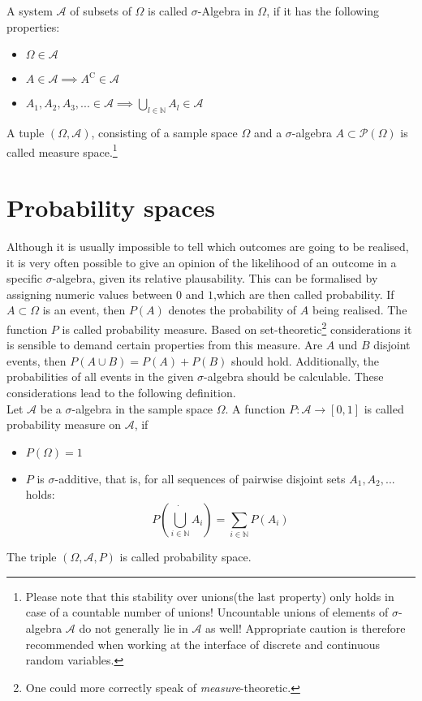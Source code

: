 \documentclass[12pt]{article}
\begin{document}
A system $\mathscr{A}$ of subsets of $\Omega$ is called $\sigma$-Algebra in $\Omega$, if it has the following properties:
\begin{itemize}
\item{$\Omega \in \mathscr{A}$}
\item{$A \in \mathscr{A} \implies A^{\mathrm{C}} \in \mathscr{A}$}
\item{$A_1, A_2, A_3, ... \in \mathscr{A} \implies \bigcup\limits_{l \in \mathbb{N}} A_l \in \mathscr{A}$}
\end{itemize}
A tuple $(\Omega, \mathscr{A})$, consisting of a sample space $\Omega$
 and a $\sigma$-algebra $A \subset \mathcal{P}(\Omega)$ is called measure space.\footnote{Please note that this \glqq stability over unions\grqq (the last property) only holds in case of a countable number of unions! Uncountable unions of elements of $\sigma$-algebra $\mathscr{A}$ do not generally lie in $\mathscr{A}$ as well! Appropriate caution is therefore recommended when working at the interface of discrete and continuous random variables.}

\section{Probability spaces}
Although it is usually impossible to tell which outcomes are going to be realised, it is very often possible to give an opinion of the likelihood of an outcome in a specific
$\sigma$-algebra, given its relative plausability. This can be formalised by assigning numeric values between $0$ and $1$,which are then called probability. If
$A \subset \Omega$ is an event, then $P(A)$ denotes the probability of $A$ being realised. The function $P$ is called probability measure. Based on set-theoretic\footnote{One could more correctly speak of \textit{measure}-theoretic.} considerations it is sensible to demand certain properties from this measure. Are $A$ und $B$ disjoint events, then
$P(A \cup B) = P(A)+P(B)$ should hold. Additionally, the probabilities of all events in the given $\sigma$-algebra should be calculable. These considerations lead to the following definition.\\

Let $\mathscr{A}$ be a $\sigma$-algebra in the sample space $\Omega$. A function $P : \mathscr{A} \to [0, 1]$ is called probability measure
on $\mathscr{A}$, if
\begin{itemize}
\item{$P(\Omega) = 1$}
\item{$P$ is $\sigma$-additive, that is, for all sequences of pairwise disjoint sets $A_1, A_2, . . .$ holds: \[
P\left( \dot{\bigcup\limits_{i \in \mathbb{N}}}A_i \right) = \sum_{i \in \mathbb{N}}P(A_i)
\]}
\end{itemize}
The triple $(\Omega, \mathscr{A}, P)$ is called probability space.
\end{document}
